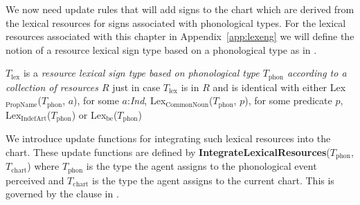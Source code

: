 We now need update rules that will add signs to the chart which are
derived from the lexical resources for signs associated with
phonological types.  For the lexical resources associated with this
chapter in Appendix~\ref{app:lexeng} we will define the notion of a
resource lexical sign type based on a phonological type as in
\nexteg{}.
\begin{ex} 
$T_{\mathrm{lex}}$ is a \textit{resource lexical sign type based on
  phonological type $T_{\mathrm{phon}}$ according to a
  collection of resources $R$} just in case $T_{\mathrm{lex}}$ is in
$R$ and is identical with either
Lex$_{\mathrm{PropName}}$($T_{\mathrm{phon}}$, $a$), for some
$a$:\textit{Ind},  Lex$_{\mathrm{CommonNoun}}$($T_{\mathrm{phon}}$,
$p$), for some predicate $p$,
Lex$_{\mathrm{IndefArt}}$($T_{\mathrm{phon}}$) or Lex$_{\mathrm{be}}$($T_{\mathrm{phon}}$)
\end{ex} 
We introduce update functions for integrating such lexical resources
into the chart.  These update functions are defined by
\textbf{IntegrateLexicalResources}($T_{\mathrm{phon}}$,
$T_{\mathrm{chart}}$) where $T_{\mathrm{phon}}$ is the type the agent
assigns to the phonological event perceived and $T_{\mathrm{chart}}$
is the type the agent assigns to the current chart.  This is governed
by the clause in \nexteg{}.
